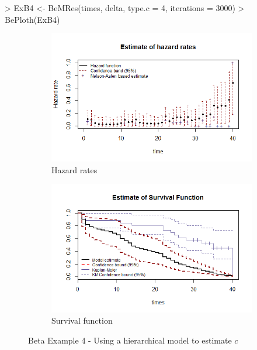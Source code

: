 \documentclass[letterpaper]{article}
\begin{document}
\begin{Schunk}
\begin{Sinput}
> ExB4 <- BeMRes(times, delta, type.c = 4, iterations = 3000)
> BePloth(ExB4)
\end{Sinput}
\end{Schunk}

\begin{figure}
  \centering
  \begin{subfigure}[a]{\textwidth}\centering
    \includegraphics[width=\textwidth]{B41.png}
    \caption{Hazard rates}
  \end{subfigure}
  \begin{subfigure}[b]{\textwidth}\centering
    \includegraphics[width=\textwidth]{B42.png}
    \caption{Survival function}
  \end{subfigure}
  \caption{Beta Example 4 - Using a hierarchical model to estimate $c$}
  \label{fig:B4}
\end{figure}
\end{document}
